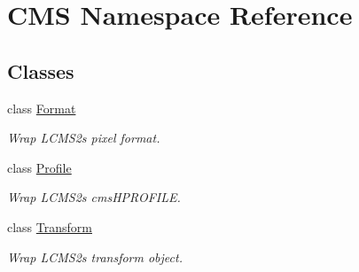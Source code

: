 \hypertarget{namespace_c_m_s}{}\section{C\+MS Namespace Reference}
\label{namespace_c_m_s}
\subsection*{Classes}
\begin{DoxyCompactItemize}
\item 
class \hyperlink{class_c_m_s_1_1_format}{Format}
\begin{DoxyCompactList}\small\item\em Wrap L\+C\+M\+S2\textquotesingle{}s pixel format. \end{DoxyCompactList}\item 
class \hyperlink{class_c_m_s_1_1_profile}{Profile}
\begin{DoxyCompactList}\small\item\em Wrap L\+C\+M\+S2\textquotesingle{}s cms\+H\+P\+R\+O\+F\+I\+LE. \end{DoxyCompactList}\item 
class \hyperlink{class_c_m_s_1_1_transform}{Transform}
\begin{DoxyCompactList}\small\item\em Wrap L\+C\+M\+S2\textquotesingle{}s transform object. \end{DoxyCompactList}\end{DoxyCompactItemize}
